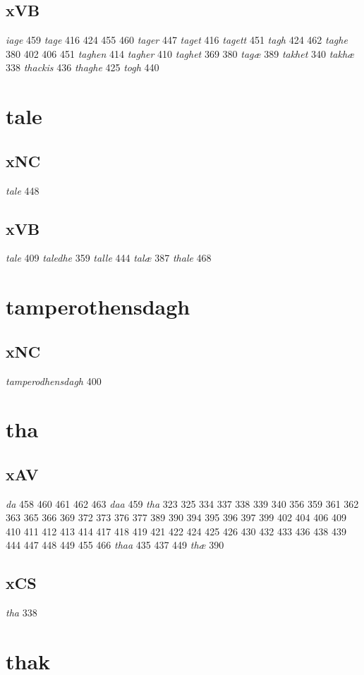 \documentclass[a4paper,twocolumn]{article}
\begin{document}
\subsection{xVB}
\label{sec:orga408491}
\emph{iage} 459 \emph{tage} 416 424 455 460 \emph{tager} 447 \emph{taget} 416 \emph{tagett} 451 \emph{tagh} 424 462 \emph{taghe} 380 402 406 451 \emph{taghen} 414 \emph{tagher} 410 \emph{taghet} 369 380 \emph{tagæ} 389 \emph{takhet} 340 \emph{takhæ} 338 \emph{thackis} 436 \emph{thaghe} 425 \emph{togh} 440 
\section{tale}
\label{sec:org8fec65b}
\subsection{xNC}
\label{sec:org39e6d3b}
\emph{tale} 448 
\subsection{xVB}
\label{sec:orga7c1b48}
\emph{tale} 409 \emph{taledhe} 359 \emph{talle} 444 \emph{talæ} 387 \emph{thale} 468 
\section{tamperothensdagh}
\label{sec:org3fae5a2}
\subsection{xNC}
\label{sec:orge995c5d}
\emph{tamperodhensdagh} 400 
\section{tha}
\label{sec:org7e75507}
\subsection{xAV}
\label{sec:org97097da}
\emph{da} 458 460 461 462 463 \emph{daa} 459 \emph{tha} 323 325 334 337 338 339 340 356 359 361 362 363 365 366 369 372 373 376 377 389 390 394 395 396 397 399 402 404 406 409 410 411 412 413 414 417 418 419 421 422 424 425 426 430 432 433 436 438 439 444 447 448 449 455 466 \emph{thaa} 435 437 449 \emph{thæ} 390 
\subsection{xCS}
\label{sec:org41faccf}
\emph{tha} 338 
\section{thak}
\label{sec:org3a09441}
\end{document}
